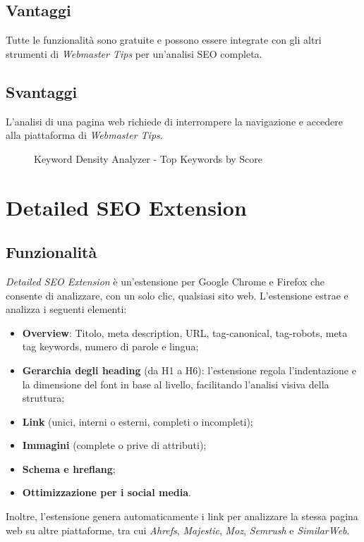 \subsection{Vantaggi}
\par Tutte le funzionalità sono gratuite e possono essere integrate con gli altri strumenti di \textit{Webmaster Tips} per un'analisi SEO completa.

\subsection{Svantaggi}
\par L'analisi di una pagina web richiede di interrompere la navigazione e accedere alla piattaforma di \textit{Webmaster Tips}.

\begin{figure}[H]
    \centering 
    \caption{Keyword Density Analyzer - Top Keywords by Score}
\end{figure}

\section{Detailed SEO Extension}

\subsection{Funzionalità}
\par \textit{Detailed SEO Extension} è un'estensione per Google Chrome e Firefox che consente di analizzare, con un solo clic, qualsiasi sito web. L'estensione estrae e analizza i seguenti elementi:
\begin{itemize}
    \item \textbf{Overview}: Titolo, meta description, URL, \gls{tag-canonical}, \gls{tag-robots}, meta tag keywords, numero di parole e lingua;
    \item \textbf{Gerarchia degli heading} (da H1 a H6): l'estensione regola l'indentazione e la dimensione del font in base al livello, facilitando l'analisi visiva della struttura;
    \item \textbf{Link} (unici, interni o esterni, completi o incompleti);
    \item \textbf{Immagini} (complete o prive di attributi);
    \item \textbf{Schema e \gls{hreflang}};
    \item \textbf{Ottimizzazione per i social media}.
\end{itemize}
\par\noindent Inoltre, l'estensione genera automaticamente i link per analizzare la stessa pagina web su altre piattaforme, tra cui \textit{Ahrefs}, \textit{Majestic}, \textit{Moz}, \textit{Semrush} e \textit{SimilarWeb}.

